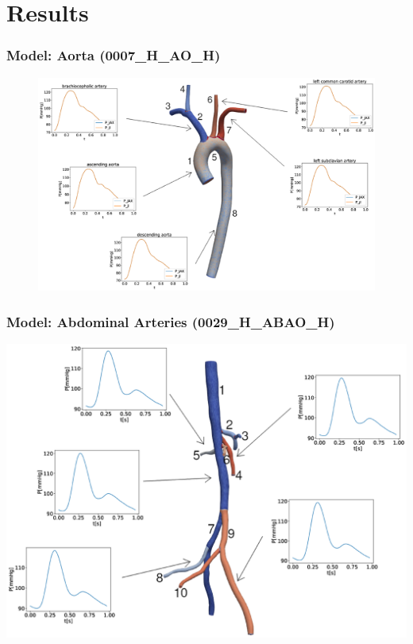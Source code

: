 \documentclass{beamer}
\begin{document}
\section{Results}
\begin{frame}
	\frametitle{Model: Aorta (0007\_H\_AO\_H)}
	\begin{figure} [H]
		\centering
		\includegraphics[width=\columnwidth]{images/0007.eps}
		\label{fig:aorta}
	\end{figure}
\end{frame}
\begin{frame}
	\frametitle{Model: Abdominal Arteries (0029\_H\_ABAO\_H)}
	\includegraphics[width=\columnwidth]{images/0029.eps}
\end{frame}
\end{document}

